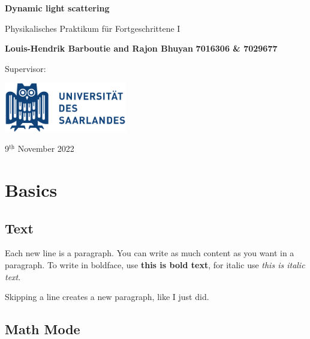 \documentclass{article}
\begin{document}
\begin{titlepage}
    \begin{center}
        \vspace*{1cm}
        \Huge
        \textbf{Dynamic light scattering}
        
        \vspace{0.5cm}
        \LARGE
        Physikalisches Praktikum für Fortgeschrittene I
        
        \vspace{1.5cm}
        \textbf{Louis-Hendrik Barboutie and Rajon Bhuyan} \newline
        \textbf{7016306 \& 7029677}
        
        \vspace{0.5cm}
        \Large 
        Supervisor:
        
        \vfill

        \includegraphics[width=0.4\textwidth]{logo_uni.png}
        
        \Large
        9$^{\underline{\text{th}}}$ November 2022
    \end{center}
\end{titlepage}

\tableofcontents

\newpage

\section{Basics} %

\subsection{Text} %
Each new line is a paragraph. You can write as much content as you want in a paragraph. To write in boldface, use \textbf{this is bold text}, for italic use \textit{this is italic text}.

Skipping a line creates a new paragraph, like I just did.

\subsection{Math Mode}
\end{document}
